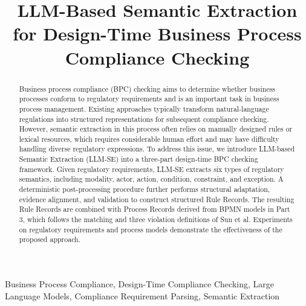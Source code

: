 \documentclass[conference]{IEEEtran}
\begin{document}
\title{LLM-Based Semantic Extraction for Design-Time Business Process Compliance Checking}

\author{
}

\maketitle

\begin{abstract}
Business process compliance (BPC) checking aims to determine whether business processes conform to regulatory requirements and is an important task in business process management. Existing approaches typically transform natural-language regulations into structured representations for subsequent compliance checking. However, semantic extraction in this process often relies on manually designed rules or lexical resources, which requires considerable human effort and may have difficulty handling diverse regulatory expressions. To address this issue, we introduce LLM-based Semantic Extraction (LLM-SE) into a three-part design-time BPC checking framework. Given regulatory requirements, LLM-SE extracts six types of regulatory semantics, including modality, actor, action, condition, constraint, and exception. A deterministic post-processing procedure further performs structural adaptation, evidence alignment, and validation to construct structured Rule Records. 
The resulting Rule Records are combined with Process Records derived from BPMN models in Part 3, which follows the matching and three violation definitions of Sun et al.
 Experiments on regulatory requirements and process models demonstrate the effectiveness of the proposed approach.
\end{abstract}

\begin{IEEEkeywords}
Business Process Compliance, Design-Time Compliance Checking, Large Language Models, Compliance Requirement Parsing, Semantic Extraction
\end{IEEEkeywords}
\end{document}
